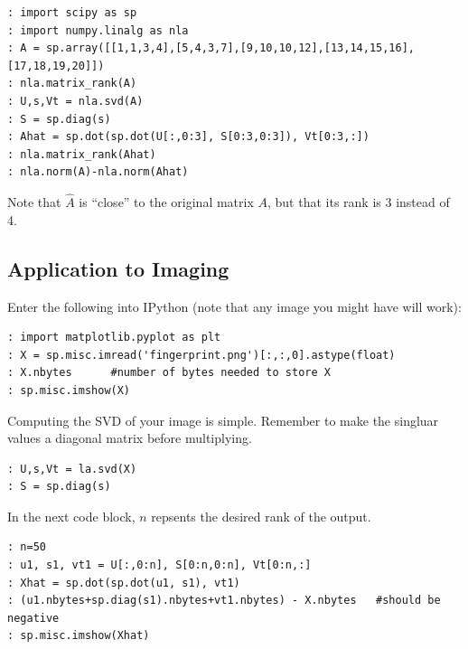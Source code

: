 \begin{lstlisting}[style=python]
: import scipy as sp
: import numpy.linalg as nla
: A = sp.array([[1,1,3,4],[5,4,3,7],[9,10,10,12],[13,14,15,16],[17,18,19,20]])
: nla.matrix_rank(A)
: U,s,Vt = nla.svd(A)
: S = sp.diag(s)
: Ahat = sp.dot(sp.dot(U[:,0:3], S[0:3,0:3]), Vt[0:3,:])
: nla.matrix_rank(Ahat)
: nla.norm(A)-nla.norm(Ahat)
\end{lstlisting}


Note that $\widehat A$ is ``close'' to the original matrix $A$, but
that its rank is 3 instead of 4.

\subsection*{Application to Imaging}


Enter the following into IPython (note that any image you might have will work):
\begin{lstlisting}
: import matplotlib.pyplot as plt
: X = sp.misc.imread('fingerprint.png')[:,:,0].astype(float)
: X.nbytes      #number of bytes needed to store X
: sp.misc.imshow(X)
\end{lstlisting}
Computing the SVD of your image is simple.  Remember to make the singluar values a diagonal matrix before multiplying.
\begin{lstlisting}
: U,s,Vt = la.svd(X)
: S = sp.diag(s)
\end{lstlisting}
In the next code block, $n$ repsents the desired rank of the output.
\begin{lstlisting}
: n=50
: u1, s1, vt1 = U[:,0:n], S[0:n,0:n], Vt[0:n,:]
: Xhat = sp.dot(sp.dot(u1, s1), vt1)
: (u1.nbytes+sp.diag(s1).nbytes+vt1.nbytes) - X.nbytes   #should be negative
: sp.misc.imshow(Xhat)
\end{lstlisting}


